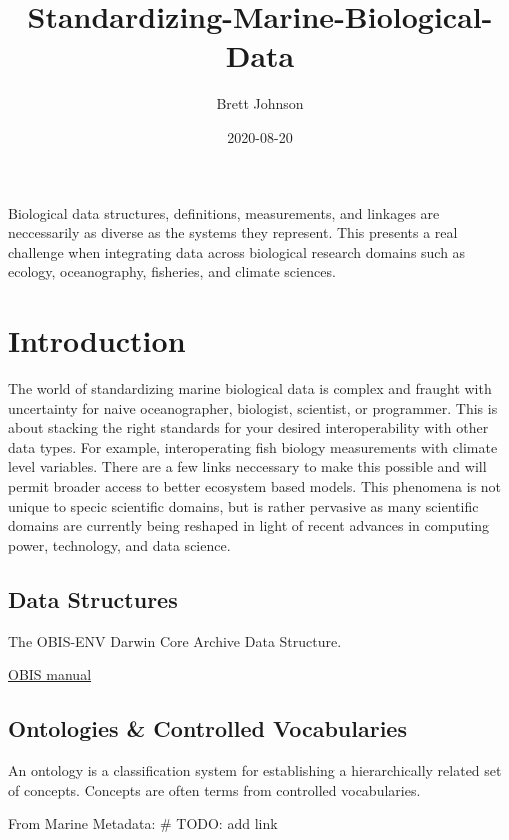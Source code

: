 \documentclass[]{book}
\title{Standardizing-Marine-Biological-Data}
\author{Brett Johnson}
\date{2020-08-20}
\begin{document}
\maketitle

{
\setcounter{tocdepth}{1}
\tableofcontents
}
Biological data structures, definitions, measurements, and linkages are neccessarily as diverse as the systems they represent. This presents a real challenge when integrating data across biological research domains such as ecology, oceanography, fisheries, and climate sciences.

\hypertarget{intro}{%
\chapter{Introduction}\label{intro}}

The world of standardizing marine biological data is complex and fraught with uncertainty for naive oceanographer, biologist, scientist, or programmer.
This is about stacking the right standards for your desired interoperability with other data types.
For example, interoperating fish biology measurements with climate level variables.
There are a few links neccessary to make this possible and will permit broader access to better ecosystem based models.
This phenomena is not unique to specic scientific domains, but is rather pervasive as many scientific domains are currently being reshaped in light of recent advances in computing power, technology, and data science.

\hypertarget{data-structures}{%
\section{Data Structures}\label{data-structures}}

The OBIS-ENV Darwin Core Archive Data Structure.

\href{\%22https://obis.org/manual/\%22}{OBIS manual}

\hypertarget{ontologies-controlled-vocabularies}{%
\section{Ontologies \& Controlled Vocabularies}\label{ontologies-controlled-vocabularies}}

An ontology is a classification system for establishing a hierarchically related set of concepts. Concepts are often terms from controlled vocabularies.

From Marine Metadata: \# TODO: add link
\end{document}
